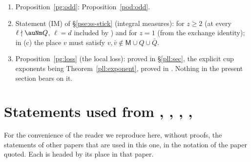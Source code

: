 \documentclass[10pt]{amsart}
\theoremstyle{definition}
\theoremstyle{remark}
\begin{document}
\begin{enumerate}
Lemma~\ref{pax:conv}; the rest are published theorems, quoted with their hypotheses in
Theorem~\ref{pga:lit} and Lemmas~\ref{pga:depth0}, \ref{pga:parahoric}.
\item Proposition~\ref{pg:odd}: Proposition~\ref{pod:odd}.
\item Statement (IM) of \S\ref{pse:ss-stick} (integral measures): {\cite[Proposition~3.8]{P54}} for $z\ge2$
(at every $\ell\nmid\auNm Q$, $\ell=d$ included by {\cite[Lemma~3.6]{P54}}) and {\cite[Proposition~3.12]{P54}}
for $z=1$ (from the exchange identity); in (c) the place $v$ must satisfy $v,\bar v\notin
\mathsf M\cup Q\cup\bar Q$.
\item Proposition~\ref{pg:loss} (the local loss): proved in \S\ref{pll:sec}, the explicit
cup exponents being Theorem~\ref{pll:exponent}, proved in {\cite[\S2.3]{P56}}. Nothing in the
present section bears on it.
\end{enumerate}


\appendix

\section{Statements used from \texorpdfstring{\cite{P46}}{[P46]}, \texorpdfstring{\cite{P49}}{[P49]}, \texorpdfstring{\cite{P53}}{[P53]}, \texorpdfstring{\cite{P54}}{[P54]}, \texorpdfstring{\cite{P56}}{[P56]}}\label{C3:quoted}

For the convenience of the reader we reproduce here, without proofs, the statements of other papers that are used in this one, in the notation of the paper quoted. Each is headed by its place in that paper.
\end{document}
